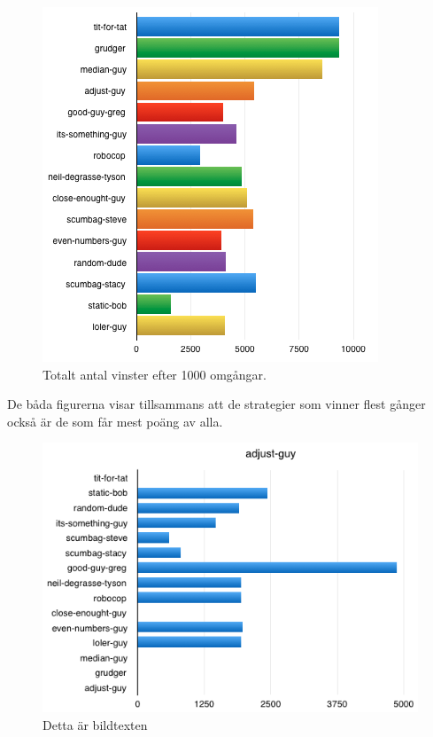\begin{figure}[htb]
	\begin{center}
	\includegraphics[scale=0.75, angle=0]{bilder/wins.png}
	\caption{Totalt antal vinster efter 1000 omgångar.}
	\label{wins}
	\end{center}
\end{figure}

De båda figurerna visar tillsammans att de strategier som vinner flest gånger också är de som får mest poäng av alla. 

\begin{figure}[htb]
	\begin{center}
	\includegraphics[scale=0.75, angle=0]{bilder/adjust-guy.png}
	\caption{Detta är bildtexten}
	\label{adjust-guy}
	\end{center}
\end{figure}

